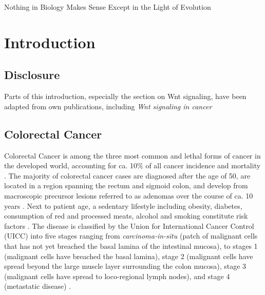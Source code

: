 \begin{savequote}[75mm]
Nothing in Biology Makes Sense Except in the Light of Evolution
\end{savequote}

\chapter{Introduction}
\label{introduction}
\begin{flushleft}
\setlength{\parindent}{7ex}
\section{Disclosure}
Parts of this introduction, especially the section on Wnt signaling, have been adapted from own publications, including \textit{Wnt signaling in cancer} \cite{Zhan2017}

\section{Colorectal Cancer}

Colorectal Cancer is among the three most common and lethal forms of cancer in the developed world, accounting for ca. 10\% of all cancer incidence and mortality \cite{sungGlobalCancerStatistics2021}. The majority of colorectal cancer cases are diagnosed after the age of 50, are located in a region spanning the rectum and sigmoid colon, and develop from macroscopic precursor lesions referred to as adenomas over the course of ca. 10 years \cite{Cho1992}. Next to patient age, a sedentary lifestyle including obesity, diabetes, consumption of red and processed meats, alcohol and smoking constitute risk factors \cite{sungGlobalCancerStatistics2021}. The disease is classified by the Union for International Cancer Control (UICC) into five stages ranging from \textit{carcinoma-in-situ} (patch of malignant cells that has not yet breached the basal lamina of the intestinal mucosa), to stages 1 (malignant cells have breached the basal lamina), stage 2 (malignant cells have spread beyond the large muscle layer surrounding the colon mucosa), stage 3 (malignant cells have spread to loco-regional lymph nodes), and stage 4 (metastatic disease) \cite{ColorectalCancerStages2012}.\par


\end{flushleft}
